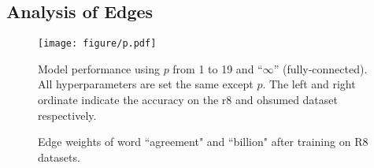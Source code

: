 \documentclass[11pt,a4paper]{article}
\begin{document}
\subsection{Analysis of Edges}
\begin{figure}[t]
    \centering
    \texttt{[image: figure/p.pdf]}
    \caption{Model performance using $p$ from 1 to 19 and ``$\infty$'' (fully-connected). All hyperparameters are set the same except $p$. The left and right ordinate indicate the accuracy on the r8 and ohsumed dataset respectively.}
    \label{fig:p}
\end{figure} 



\iffalse
\begin{figure}[t]
\footnotesize
\centering

\begin{minipage}{0.22\textwidth}
\centering
{}
\subcaption{}
\end{minipage}
\begin{minipage}{0.22\textwidth}  
\centering
{}
\subcaption{}
\end{minipage}
\centering
\caption{Edge weights of word ``agreement" and ``billion" after training on R8 datasets. }\label{tab:meaning}
\end{figure}
\end{document}
